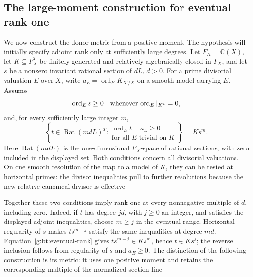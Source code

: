 \subsection{The large-moment construction for eventual rank one}
\label{g:bt:eventual}

We now construct the donor metric from a positive moment. The hypothesis
will initially specify adjoint rank only at sufficiently large degrees.
Let $F_X=\mathbb C(X)$, let $K\subseteq F_X^T$ be finitely generated and
relatively algebraically closed in $F_X$, and let $s$ be a nonzero
invariant rational section of $dL$, $d>0$.
For a prime divisorial valuation $E$ over $X$, write
$a_E=\operatorname{ord}_E K_{X'/X}$ on a smooth model carrying $E$.
Assume
\begin{equation}\label{g:bt:horizontal-regular}
 \operatorname{ord}_E s\geq0
       \quad\hbox{whenever $\operatorname{ord}_E|_{K^*}=0$},
\end{equation}
and, for every sufficiently large integer $m$,
\begin{equation}\label{g:bt:eventual-rank}
 \left\{t\in\operatorname{Rat}(mdL)^T:
   \begin{array}{l}
    \operatorname{ord}_E t+a_E\geq0\\[-2pt]
    \text{for all $E$ trivial on $K$}
   \end{array}\right\}=K s^m.
\end{equation}
Here $\operatorname{Rat}(mdL)$ is the one-dimensional $F_X$-space of
rational sections, with zero included in the displayed set.
Both conditions concern all divisorial valuations.  On one smooth
resolution of the map to a model of $K$, they can be tested at
horizontal primes: the divisor inequalities pull to further resolutions
because the new relative canonical divisor is effective.

Together these two conditions imply rank one at every nonnegative
multiple of $d$, including zero. Indeed, if $t$ has degree $jd$, with
$j\geq0$ an integer, and satisfies
the displayed adjoint inequalities, choose $m\geq j$ in the eventual
range. Horizontal regularity of $s$ makes $ts^{m-j}$ satisfy the same
inequalities at degree $md$. Equation~\eqref{g:bt:eventual-rank} gives
$ts^{m-j}\in Ks^m$, hence $t\in Ks^j$; the reverse inclusion follows
from regularity of $s$ and $a_E\geq0$. The distinction of the following
construction is its metric: it uses one positive moment and retains
the corresponding multiple of the normalized section line.

